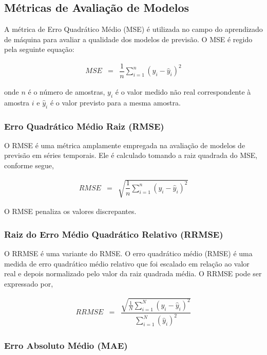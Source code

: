 \subsection{M\'etricas de Avalia\c c\~ao de Modelos}\label{subsec:metrica}

A métrica de Erro Quadrático Médio (MSE) é utilizada no campo do aprendizado de máquina para avaliar a qualidade dos modelos de previsão. O MSE é regido pela seguinte equação:

\begin{eqnarray}
	MSE &=& \dfrac{1}{n} \sum_{i=1}^{n} (y_i - \hat{y}_i)^2 \label{eq:mse}
\end{eqnarray}

\noindent onde $n$ é o número de amostras, $y_i$ é o valor medido não real correspondente à amostra $i$ e $\hat{y}_i$ é o valor previsto para a mesma amostra.

\subsubsection{Erro Quadr\'atico M\'edio Raiz (RMSE)}

O RMSE é uma métrica amplamente empregada na avaliação de modelos de previsão em séries temporais. Ele é calculado tomando a raiz quadrada do MSE, conforme segue,

\begin{eqnarray}
	RMSE &=& \sqrt{\dfrac{1}{n} \sum_{i=1}^{n} (y_i - \hat{y}_i)^2} \label{eq:rmse}
\end{eqnarray}



O RMSE penaliza os valores discrepantes.

\subsubsection{Raiz do Erro M\'edio Quadr\'atico Relativo (RRMSE)}\label{subsub:rrmse}

O RRMSE é uma variante do RMSE. O erro quadrático médio (RMSE) é uma medida de erro quadrático médio relativo que foi escalado em relação ao valor real e depois normalizado pelo valor da raiz quadrada média.  O RRMSE pode ser expressado por,

\begin{eqnarray}
	R R M S E&=&\dfrac{\sqrt{\frac{1}{N} \sum_{i=1}^N\left(y_i-\hat{y}_i\right)^2}}{\sum_{i=1}^N\left(\hat{y}_i\right)^2}
\end{eqnarray}

\subsubsection{Erro Absoluto M\'edio (MAE)}

